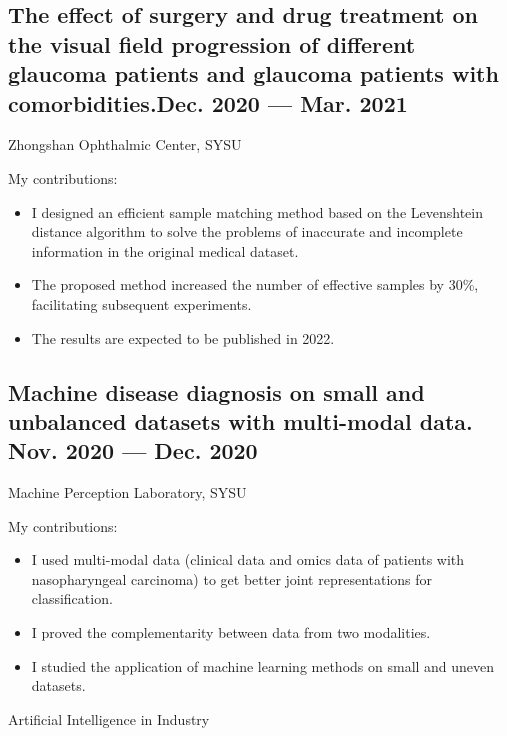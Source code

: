 \documentclass[a4,11pt]{article}
\newcommand{\subtext}[1]{
#1\par\vspace{-0.2cm}}
\begin{document}
\subsection*{The effect of surgery and drug treatment on the visual field progression of different glaucoma patients and glaucoma patients with comorbidities.\hfill Dec. 2020 --- Mar. 2021} 
\subtext{Zhongshan Ophthalmic Center, SYSU }
\vspace {6pt}
My contributions:
    \begin{itemize}[topsep = 0 pt, itemsep = 0 pt, parsep = 1 pt]
       \item I designed an efficient sample matching method based on the Levenshtein distance algorithm to solve the problems of inaccurate and incomplete information in the original medical dataset.  
		\item The proposed method increased the number of effective samples by 30\%, facilitating subsequent experiments.
		\item The results are expected to be published in 2022.

    \end{itemize}


\subsection*{Machine disease diagnosis on small and unbalanced datasets with multi-modal data. \hfill Nov. 2020 --- Dec. 2020} 
\subtext{Machine Perception Laboratory, SYSU} 
\vspace {6pt}
My contributions:
    \begin{itemize}[topsep = 0 pt, itemsep = 0 pt, parsep = 1 pt]
        \item I used multi-modal data (clinical data and omics data of patients with nasopharyngeal carcinoma) to get better joint representations for classification. 
		\item I proved the complementarity between data from two modalities.
		\item I studied the application of machine learning methods on small and uneven datasets. 
    \end{itemize}
\vspace {12pt}

\centerline{\textcolor{UI_blue}{Artificial Intelligence in Industry}}
\vspace {-10pt}
\end{document}
